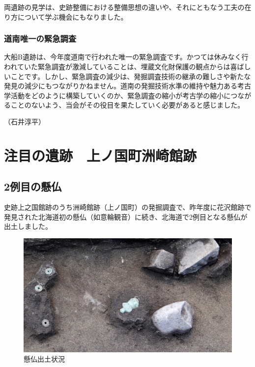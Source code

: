 \documentclass[a4j,11pt,twocolumn,openany]{jsbook}
\begin{document}
両遺跡の見学は、史跡整備における整備思想の違いや、それにともなう工夫の在り方について学ぶ機会にもなりました。

\subsection{道南唯一の緊急調査}
大船B遺跡は、今年度道南で行われた唯一の緊急調査です。かつては休みなく行われていた緊急調査が激減していることは、埋蔵文化財保護の観点からは喜ばしいことです。しかし、緊急調査の減少は、発掘調査技術の継承の難しさや新たな発見の減少にもつながりかねません。道南の発掘技術水準の維持や魅力ある考古学活動をどのように構築していくのか、緊急調査の縮小が考古学の縮小につながることのないよう、当会がその役目を果たしていく必要があると感じました。
\begin{flushright}
	（石井淳平）
\end{flushright}


\chapter{注目の遺跡　上ノ国町洲崎館跡　}

\section{2例目の懸仏}

史跡上之国館跡のうち洲崎館跡（上ノ国町）の発掘調査で、昨年度に花沢館跡で発見された北海道初の懸仏（如意輪観音）に続き、北海道で2例目となる懸仏が出土しました。

\begin{figure}[ht]
	\centering
	\includegraphics[width=\linewidth]{fig/08_Tukada/02shutudo.JPG}
	\caption{懸仏出土状況}
	\label{}
	\vspace{-\baselineskip}
\end{figure}
\end{document}
